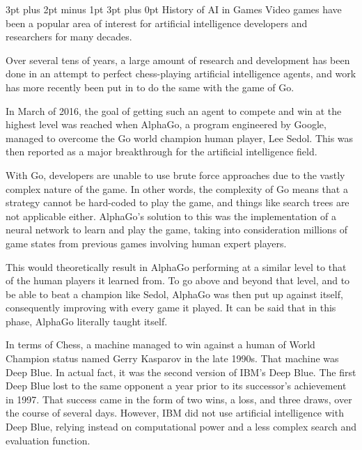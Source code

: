 \documentclass[12pt,a4paper]{article}
\makeatletter
\renewcommand\subsection{\@startsection {subsection}{1}{2mm} %
                               {3pt plus 2pt minus 1pt} %
                               {3pt plus 0pt} %
                               {\normalfont\bfseries}}
\makeatother
\begin{document}
\subsection{History of AI in Games}
Video games have been a popular area of interest for artificial intelligence developers and researchers for many decades. 

Over several tens of years, a large amount of research and development has been done in an attempt to perfect chess-playing artificial intelligence agents\citep{L2PChess}, and work has more recently been put in to do the same with the game of Go.  

In March of 2016, the goal of getting such an agent to compete and win at the highest level was reached when AlphaGo, a program engineered by Google, managed to overcome the Go world champion human player, Lee Sedol\citep{ABriefHistoryOfGameAI}. This was then reported as a major breakthrough for the artificial intelligence field. 

With Go, developers are unable to use brute force approaches due to the vastly complex nature of the game\citep{13}. In other words, the complexity of Go means that a strategy cannot be hard-coded to play the game, and things like search trees are not applicable either. AlphaGo's solution to this was the implementation of a neural network to learn and play the game, taking into consideration millions of game states from previous games involving human expert players. 

This would theoretically result in AlphaGo performing at a similar level to that of the human players it learned from. To go above and beyond that level, and to be able to beat a champion like Sedol, AlphaGo was then put up against itself, consequently improving with every game it played\citep{13}. It can be said that in this phase, AlphaGo literally taught itself. 

In terms of Chess, a machine managed to win against a human of World Champion status named Gerry Kasparov in the late 1990s\citep{14}. That machine was Deep Blue. In actual fact, it was the second version of IBM's Deep Blue. The first Deep Blue lost to the same opponent a year prior to its successor's achievement in 1997\citep{14}. That success came in the form of two wins, a loss, and three draws\citep{15}, over the course of several days. However, IBM did not use artificial intelligence with Deep Blue, relying instead on computational power and a less complex search and evaluation function\citep{16}. \\
\end{document}
